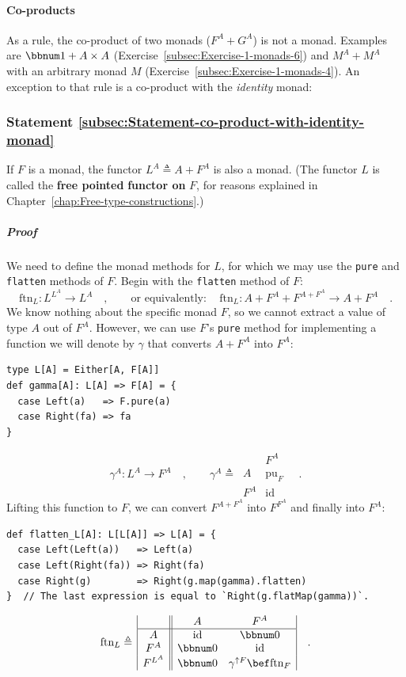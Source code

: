 \paragraph{Co-products}

As a rule, the co-product of two monads ($F^{A}+G^{A}$) is not a
monad. Examples are $\bbnum 1+A\times A$ (Exercise~\ref{subsec:Exercise-1-monads-6})
and $M^{A}+M^{A}$ with an arbitrary monad $M$ (Exercise~\ref{subsec:Exercise-1-monads-4}).
An exception to that rule is a co-product with the \emph{identity}
monad:

\subsubsection{Statement \label{subsec:Statement-co-product-with-identity-monad}\ref{subsec:Statement-co-product-with-identity-monad}}

If $F$ is a monad, the functor $L^{A}\triangleq A+F^{A}$ is also
a monad. (The functor $L$ is called the \textbf{free pointed}
\textbf{functor on} $F$, for reasons explained in Chapter~\ref{chap:Free-type-constructions}.)

\subparagraph{Proof}

We need to define the monad methods for $L$, for which we may use
the \lstinline!pure! and \lstinline!flatten! methods of $F$. Begin
with the \lstinline!flatten! method of $F$:
\[
\text{ftn}_{L}:L^{L^{A}}\rightarrow L^{A}\quad,\quad\quad\text{or equivalently}:\quad\text{ftn}_{L}:A+F^{A}+F^{A+F^{A}}\rightarrow A+F^{A}\quad.
\]
We know nothing about the specific monad $F$, so we cannot extract
a value of type $A$ out of $F^{A}$. However, we can use $F$\textsf{'}s \lstinline!pure!
method for implementing a function we will denote by $\gamma$ that
converts $A+F^{A}$ into $F^{A}$:
\begin{lstlisting}
type L[A] = Either[A, F[A]]
def gamma[A]: L[A] => F[A] = {
  case Left(a)   => F.pure(a)
  case Right(fa) => fa
}
\end{lstlisting}
\[
\gamma^{A}:L^{A}\rightarrow F^{A}\quad,\quad\quad\gamma^{A}\triangleq\,\begin{array}{|c||c|}
 & F^{A}\\
\hline A & \text{pu}_{F}\\
F^{A} & \text{id}
\end{array}\quad.
\]
Lifting this function to $F$, we can convert $F^{A+F^{A}}$ into
$F^{F^{A}}$ and finally into $F^{A}$:
\begin{lstlisting}
def flatten_L[A]: L[L[A]] => L[A] = {
  case Left(Left(a))   => Left(a)
  case Left(Right(fa)) => Right(fa)
  case Right(g)        => Right(g.map(gamma).flatten)
}  // The last expression is equal to `Right(g.flatMap(gamma))`.
\end{lstlisting}
\[
\text{ftn}_{L}\triangleq\,\begin{array}{|c||cc|}
 & A & F^{A}\\
\hline A & \text{id} & \bbnum 0\\
F^{A} & \bbnum 0 & \text{id}\\
F^{L^{A}} & \bbnum 0 & \gamma^{\uparrow F}\bef\text{ftn}_{F}
\end{array}\quad.
\]

